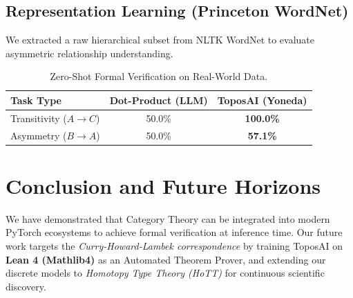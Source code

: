 \documentclass[11pt,a4paper]{article}
\begin{document}
\subsection{Representation Learning (Princeton WordNet)}
We extracted a raw hierarchical subset from NLTK WordNet to evaluate asymmetric relationship understanding.
\begin{table}[h]
\centering
\begin{tabular}{@{}lcc@{}}
\toprule
\textbf{Task Type} & \textbf{Dot-Product (LLM)} & \textbf{ToposAI (Yoneda)} \\
\midrule
Transitivity ($A \rightarrow C$) & 50.0\% & \textbf{100.0\%} \\
Asymmetry ($B \rightarrow A$) & 50.0\% & \textbf{57.1\%} \\
\bottomrule
\end{tabular}
\caption{Zero-Shot Formal Verification on Real-World Data.}
\end{table}

\section{Conclusion and Future Horizons}
We have demonstrated that Category Theory can be integrated into modern PyTorch ecosystems to achieve formal verification at inference time. Our future work targets the \textit{Curry-Howard-Lambek correspondence} by training ToposAI on \textbf{Lean 4 (Mathlib4)} as an Automated Theorem Prover, and extending our discrete models to \textit{Homotopy Type Theory (HoTT)} for continuous scientific discovery.
\end{document}
